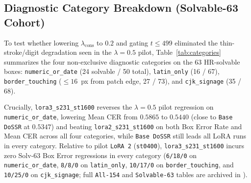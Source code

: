 \documentclass[11pt]{article}
\begin{document}
\subsection{Diagnostic Category Breakdown (Solvable-63 Cohort)}
To test whether lowering $\lambda_{\text{cons}}$ to $0.2$ and gating $t \le 499$ eliminated the thin-stroke/digit degradation seen in the $\lambda=0.5$ pilot, Table~\ref{tab:categories} summarizes the four non-exclusive diagnostic categories on the 63 HR-solvable boxes: \texttt{numeric\_or\_date} (24 solvable / 50 total), \texttt{latin\_only} (16 / 67), \texttt{border\_touching} ($\le 16$~px from patch edge, 27 / 73), and \texttt{cjk\_signage} (35 / 68).

\begin{table}[ht]
\centering
\small
\caption{Diagnostic category metrics on the 63 HR-solvable boxes (Box Error Rate / Mean CER). Bold marks the best Box Error Rate and Mean CER separately among the diffusion/LoRA rows; Bicubic $\times 4$ achieves the lowest OCR error overall in all four categories.}
\label{tab:categories}
\end{table}

Crucially, \texttt{lora3\_s231\_st1600} reverses the $\lambda=0.5$ pilot regression on \texttt{numeric\_or\_date}, lowering Mean CER from $0.5865$ to $0.5440$ (close to \texttt{Base DoSSR} at $0.5347$) and beating \texttt{lora2\_s231\_st1600} on both Box Error Rate and Mean CER across all four categories, while \texttt{Base DoSSR} still leads all LoRA runs in every category. Relative to pilot \texttt{LoRA~2} (\texttt{st0400}), \texttt{lora3\_s231\_st1600} incurs zero Solv-63 Box Error regressions in every category (\texttt{6/18/0} on \texttt{numeric\_or\_date}, \texttt{8/8/0} on \texttt{latin\_only}, \texttt{10/17/0} on \texttt{border\_touching}, and \texttt{10/25/0} on \texttt{cjk\_signage}; full \texttt{All-154} and \texttt{Solvable-63} tables are archived in ).
\end{document}
